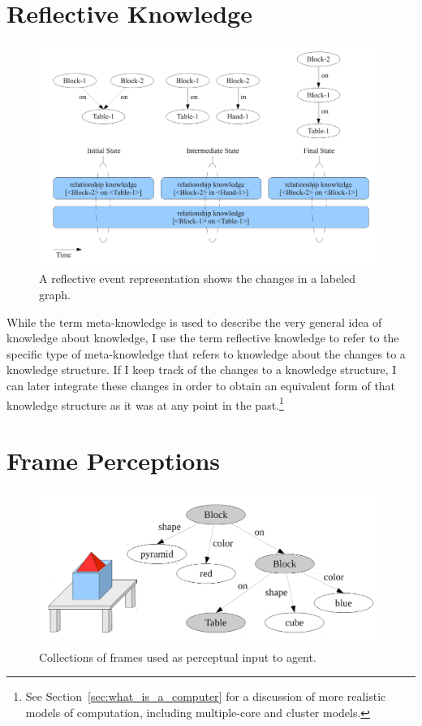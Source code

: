 \section{Reflective Knowledge}

\begin{figure}[bth]
  \center
  \includegraphics[width=12cm]{gfx/reflective_event_representation}
  \caption[A reflective event representation]{A reflective event representation shows the changes in a labeled graph.}
  \label{fig:reflective_event_representation}
\end{figure}


While the term meta-knowledge is used to describe the very general
idea of knowledge about knowledge, I use the term reflective knowledge
to refer to the specific type of meta-knowledge that refers to
knowledge about the changes to a knowledge structure.  If I keep track
of the changes to a knowledge structure, I can later integrate these
changes in order to obtain an equivalent form of that knowledge
structure as it was at any point in the past.\footnote{See
  Section~\ref{sec:what_is_a_computer} for a discussion of more
  realistic models of computation, including multiple-core and cluster
  models.}




\section{Frame Perceptions}

\begin{figure}[bth]
  \center
  \includegraphics[height=5cm]{gfx/frame_perception}
  \caption[Collections of frames used as perceptual input to agent]{Collections of frames used as perceptual input to agent.}
  \label{fig:frame_perception}
\end{figure}

